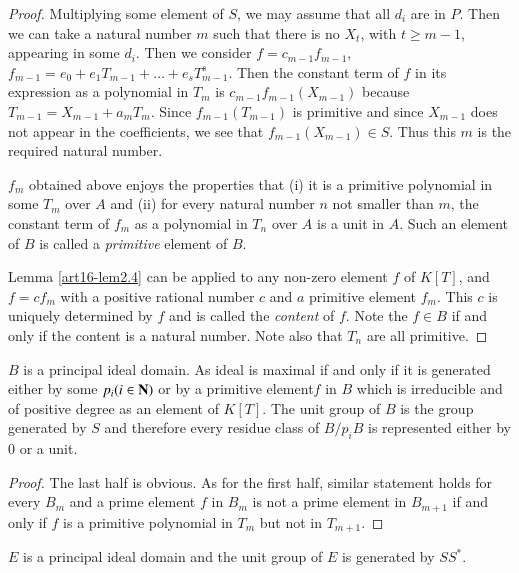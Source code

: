 \begin{proof}
Multiplying some element of $S$, we may assume that all $d_i$ are in $P$. Then we can take a natural number $m$ such that there is no $X_t$, with $t \geqslant m-1$, appearing in some $d_i$. Then we consider $f = c_{m-1}f_{m-1}$, $f_{m-1} = e_0 + e_1 T_{m-1} + \ldots + e_s T_{m-1}^s$. Then the constant term of $f$ in its expression as a polynomial in $T_m$ is $c_{m-1}f_{m-1} (X_{m-1})$ because $T_{m-1} = X_{m-1} + a_m T_m$. Since $f_{m-1} (T_{m-1})$ is primitive and since $X_{m-1}$ does not appear in the coefficients, we see that $f_{m-1} (X_{m-1}) \in S$. Thus this $m$ is the required natural number.

$f_m$ obtained above enjoys the properties that (i) it is a primitive polynomial in some $T_m$ over $A$ and (ii) for every natural number $n$ not smaller than $m$, the constant term of $f_m$ as a polynomial in $T_n$ over $A$ is 
a unit in $A$. Such an element of $B$ is called a {\em primitive} element of $B$.

Lemma \ref{art16-lem2.4} can be applied to any non-zero element $f$ of $K[T]$, and $f = cf_m$ with a positive rational number $c$ and $a$ primitive element $f_m$. This $c$ is uniquely determined by $f$ and is called the {\em content} of $f$. Note the $f \in B$ if and only if the content is a natural number. Note also that $T_n$ are all primitive.
\end{proof}

\begin{lemma}\label{art16-lem2.5}
$B$ is a principal ideal domain. As ideal is maximal if and only if it is generated either by some $p_i (i \in \mathbf{N})$ or by a primitive element\pageoriginale $f$ in $B$ which is irreducible and of positive degree as an element of $K[T]$. The unit group of $B$ is the group generated by $S$ and therefore every residue class of $B/p_i B$ is represented either by 0 or a unit.  
\end{lemma}

\begin{proof}
The last half is obvious. As for the first half, similar statement holds for every $B_m$ and a prime element $f$ in $B_m$ is not a prime element in $B_{m+1}$ if and only if $f$ is a primitive polynomial in $T_m$ but not in $T_{m+1}$.
\end{proof}

\begin{corollary}\label{art16-coro2.6}
$E$ is a principal ideal domain and the unit group of $E$ is generated by $SS^*$.
\end{corollary}
 
